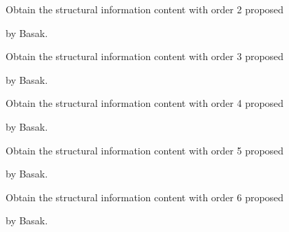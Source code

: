 \documentclass[letterpaper,10pt,english]{sphinxmanual}
\begin{document}
\begin{fulllineitems}
\label{reference/basak:basak.CalculateBasakSIC2}
Obtain the structural information content with order 2 proposed

by Basak.

\end{fulllineitems}


\begin{fulllineitems}
\label{reference/basak:basak.CalculateBasakSIC3}
Obtain the structural information content with order 3 proposed

by Basak.

\end{fulllineitems}


\begin{fulllineitems}
\label{reference/basak:basak.CalculateBasakSIC4}
Obtain the structural information content with order 4 proposed

by Basak.

\end{fulllineitems}


\begin{fulllineitems}
\label{reference/basak:basak.CalculateBasakSIC5}
Obtain the structural information content with order 5 proposed

by Basak.

\end{fulllineitems}


\begin{fulllineitems}
\label{reference/basak:basak.CalculateBasakSIC6}
Obtain the structural information content with order 6 proposed

by Basak.

\end{fulllineitems}
\end{document}
